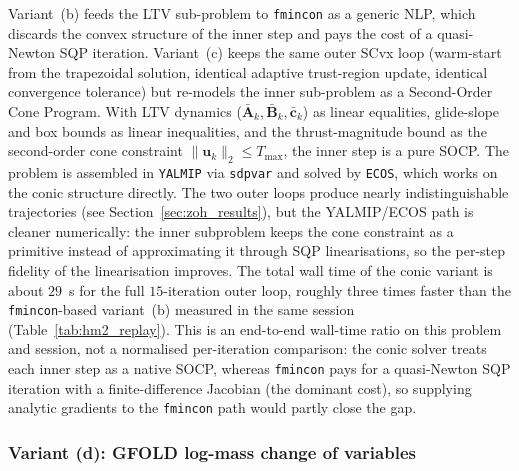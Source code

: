 \documentclass[../main.tex]{subfiles}
\begin{document}
Variant~(b) feeds the LTV sub-problem to \texttt{fmincon} as a generic NLP, which discards the convex structure of the inner step and pays the cost of a quasi-Newton SQP iteration. Variant~(c) keeps the same outer SCvx loop (warm-start from the trapezoidal solution, identical adaptive trust-region update, identical convergence tolerance) but re-models the inner sub-problem as a Second-Order Cone Program. With LTV dynamics ($\bar{\mathbf{A}}_k,\bar{\mathbf{B}}_k,\bar{\mathbf{c}}_k$) as linear equalities, glide-slope and box bounds as linear inequalities, and the thrust-magnitude bound as the second-order cone constraint $\|\mathbf{u}_k\|_2 \leq T_{\max}$, the inner step is a pure SOCP. The problem is assembled in \texttt{YALMIP} via \texttt{sdpvar} and solved by \texttt{ECOS}, which works on the conic structure directly. The two outer loops produce nearly indistinguishable trajectories (see Section~\ref{sec:zoh_results}), but the YALMIP/ECOS path is cleaner numerically: the inner subproblem keeps the cone constraint as a primitive instead of approximating it through SQP linearisations, so the per-step fidelity of the linearisation improves. The total wall time of the conic variant is about $29$~s for the full $15$-iteration outer loop, roughly three times faster than the \texttt{fmincon}-based variant~(b) measured in the same session (Table~\ref{tab:hm2_replay}). This is an end-to-end wall-time ratio on this problem and session, not a normalised per-iteration comparison: the conic solver treats each inner step as a native SOCP, whereas \texttt{fmincon} pays for a quasi-Newton SQP iteration with a finite-difference Jacobian (the dominant cost), so supplying analytic gradients to the \texttt{fmincon} path would partly close the gap.

\subsubsection*{Variant (d): GFOLD log-mass change of variables}\label{sec:gfold}
\end{document}
